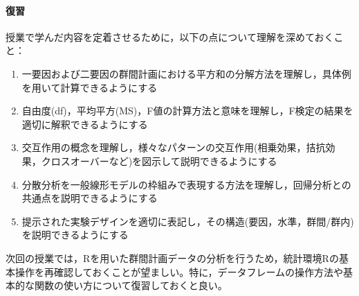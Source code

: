 \paragraph{復習}
授業で学んだ内容を定着させるために，以下の点について理解を深めておくこと：

\begin{enumerate}
\item 一要因および二要因の群間計画における平方和の分解方法を理解し，具体例を用いて計算できるようにする
\item 自由度(df)，平均平方(MS)，F値の計算方法と意味を理解し，F検定の結果を適切に解釈できるようにする
\item 交互作用の概念を理解し，様々なパターンの交互作用(相乗効果，拮抗効果，クロスオーバーなど)を図示して説明できるようにする
\item 分散分析を一般線形モデルの枠組みで表現する方法を理解し，回帰分析との共通点を説明できるようにする
\item 提示された実験デザインを適切に表記し，その構造(要因，水準，群間/群内)を説明できるようにする
\end{enumerate}

次回の授業では，Rを用いた群間計画データの分析を行うため，統計環境Rの基本操作を再確認しておくことが望ましい。特に，データフレームの操作方法や基本的な関数の使い方について復習しておくと良い。